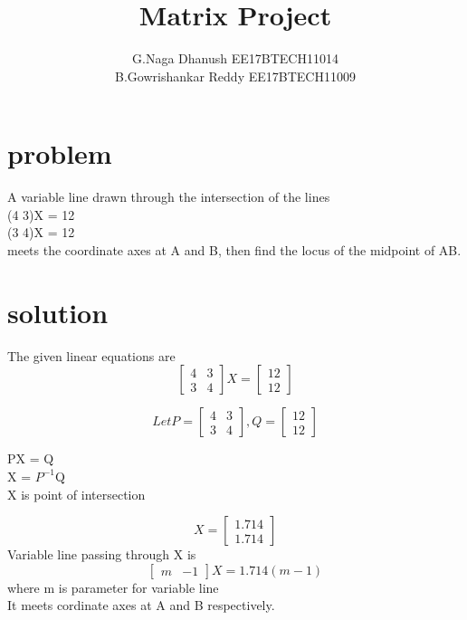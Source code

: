 \documentclass[12pt]{article}
\begin{document}
\title{Matrix Project}
\maketitle
\author{G.Naga Dhanush  EE17BTECH11014\\B.Gowrishankar Reddy   EE17BTECH11009}
\section{problem}
A variable line drawn through the intersection of the lines\\
(4 3)X = 12\\
(3 4)X = 12\\
meets the coordinate axes at A and B, then find the locus of the midpoint of AB.
\section{solution}
The given linear equations are \\
\[
\begin{bmatrix}
 4 & 3 \\
 3 & 4
\end{bmatrix}X = 
\begin{bmatrix}
 12 \\
 12
\end{bmatrix}
\]
 
 \[
Let P = 
\begin{bmatrix}
 4 & 3 \\
 3 & 4
\end{bmatrix},
 Q =
\begin{bmatrix}
 12 \\
 12
\end{bmatrix} 
\]
\begin{center}
PX = Q\\
X = $P^{-1}$Q\\
X is point of intersection

\end{center}
\[
X = 
\begin{bmatrix}
 1.714 \\
 1.714
\end{bmatrix}
\]
Variable line passing through X is
\[ 
\begin{bmatrix}
 m & -1
\end{bmatrix}X = 1.714(m-1)
\]
where m is parameter for variable line\\
It meets cordinate axes at A and B respectively.\\
\end{document}
